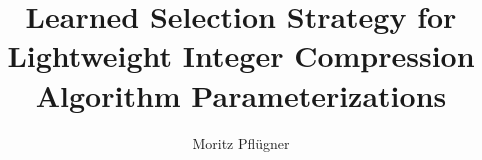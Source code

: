\documentclass[color]{tudbook}  %
\begin{document}
\beleg

\author{Moritz Pflügner}
\title{Learned Selection Strategy for Lightweight Integer Compression Algorithm Parameterizations}

\maketitle


\newpage
\confirmation


\tableofcontents










\end{document}
